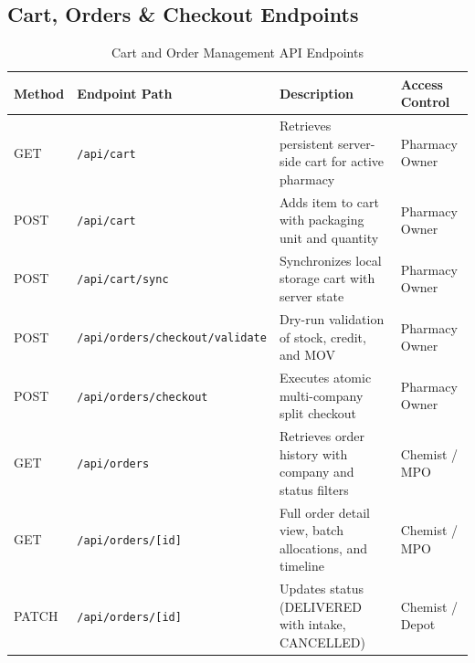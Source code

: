 \documentclass[10pt,a4paper]{article}
\begin{document}
\subsection{Cart, Orders \& Checkout Endpoints}
\begin{table}[h!]
\centering
\small
\begin{tabularx}{\textwidth}{lp{4.0cm}Xp{2.5cm}}
\toprule
\textbf{Method} & \textbf{Endpoint Path} & \textbf{Description} & \textbf{Access Control} \\
\midrule
GET & \texttt{/api/cart} & Retrieves persistent server-side cart for active pharmacy & Pharmacy Owner \\
POST & \texttt{/api/cart} & Adds item to cart with packaging unit and quantity & Pharmacy Owner \\
POST & \texttt{/api/cart/sync} & Synchronizes local storage cart with server state & Pharmacy Owner \\
POST & \texttt{/api/orders/checkout/validate} & Dry-run validation of stock, credit, and MOV & Pharmacy Owner \\
POST & \texttt{/api/orders/checkout} & Executes atomic multi-company split checkout & Pharmacy Owner \\
GET & \texttt{/api/orders} & Retrieves order history with company and status filters & Chemist / MPO \\
GET & \texttt{/api/orders/[id]} & Full order detail view, batch allocations, and timeline & Chemist / MPO \\
PATCH & \texttt{/api/orders/[id]} & Updates status (DELIVERED with intake, CANCELLED) & Chemist / Depot \\
\bottomrule
\end{tabularx}
\caption{Cart and Order Management API Endpoints}
\end{table}
\end{document}
